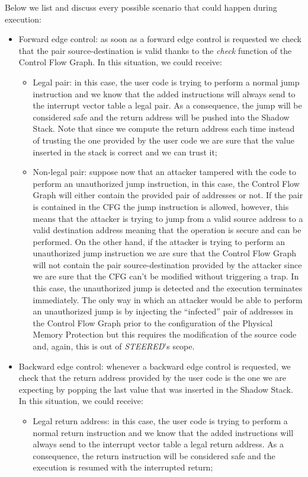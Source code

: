 Below we list and discuss every possible scenario that could happen during execution:
\begin{itemize}
  \item Forward edge control: as soon as a forward edge control is requested we
    check that the pair source-destination is valid thanks to the \textit{check}
    function of the Control Flow Graph. In this situation, we could receive:
    \begin{itemize}
      \item Legal pair: in this case, the user code is trying to perform a normal
        jump instruction and we know that the added instructions will always send
        to the interrupt vector table a legal pair. As a consequence, the jump will
        be considered safe and the return address will be pushed into the Shadow
        Stack. Note that since we compute the return address each time instead
        of trusting the one provided by the user code we are sure that the value
        inserted in the stack is correct and we can trust it;

      \item Non-legal pair: suppose now that an attacker tampered with the code
        to perform an unauthorized jump instruction, in this case, the Control
        Flow Graph will either contain the provided pair of addresses or not. If
        the pair is contained in the CFG the jump instruction is allowed,
        however, this means that the attacker is trying to jump from a valid source
        address to a valid destination address meaning that the operation is secure
        and can be performed. On the other hand, if the attacker is trying to perform
        an unauthorized jump instruction we are sure that the Control Flow Graph
        will not contain the pair source-destination provided by the attacker since
        we are sure that the CFG can't be modified without triggering a trap. In
        this case, the unauthorized jump is detected and the execution terminates
        immediately. The only way in which an attacker would be able to perform
        an unauthorized jump is by injecting the ``infected'' pair of addresses
        in the Control Flow Graph prior to the configuration of the Physical
        Memory Protection but this requires the modification of the source code
        and, again, this is out of \textit{STEERED}'s scope.
    \end{itemize}

  \item Backward edge control: whenever a backward edge control is requested, we
    check that the return address provided by the user code is the one we are expecting
    by popping the last value that was inserted in the Shadow Stack. In this
    situation, we could receive:
    \begin{itemize}
      \item Legal return address: in this case, the user code is trying to perform
        a normal return instruction and we know that the added instructions will
        always send to the interrupt vector table a legal return address. As a
        consequence, the return instruction will be considered safe and the execution
        is resumed with the interrupted return;


\end{itemize}
\end{itemize}

